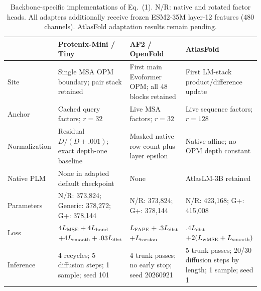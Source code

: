 \begin{table}[t]
\centering
\caption{Backbone-specific implementations of Eq.~(1). N/R: native and rotated factor heads. All adapters additionally receive frozen ESM2-35M layer-12 features (480 channels). AtlasFold adaptation results remain pending.}
\label{tab:interfaces}
\small
\begin{tabularx}{\linewidth}{@{}lXXX@{}}
\toprule
& Protenix-Mini / Tiny & AF2 / OpenFold & AtlasFold \\
\midrule
Site & Single MSA OPM boundary; pair stack retained & First main Evoformer OPM; all 48 blocks retained & First LM-stack product/difference update \\
Anchor & Cached query factors; $r=32$ & Live MSA factors; $r=32$ & Live sequence factors; $r=128$ \\
Normalization & Residual $D/(D+.001)$; exact depth-one baseline & Masked native row count plus layer epsilon & Native affine; no OPM depth constant \\
Native PLM & None in adapted default checkpoint & None & AtlasLM-3B retained \\
Parameters & N/R: 373,824; Generic: 378,272; G+: 378,144 & N/R: 373,824; G+: 378,144 & N/R: 423,168; G+: 415,008 \\
Loss & $4L_{\rm MSE}+4L_{\rm bond}$\newline $+4L_{\rm smooth}+.03L_{\rm dist}$ & $L_{\rm FAPE}+.3L_{\rm dist}$\newline $+L_{\rm torsion}$ & $.4L_{\rm dist}$\newline $+2(L_{\rm wMSE}+L_{\rm smooth})$ \\
Inference & 4 recycles; 5 diffusion steps; 1 sample; seed 101 & 4 trunk passes; no early stop; seed 20260921 & 5 trunk passes; 20/30 diffusion steps by length; 1 sample; seed 1 \\
\bottomrule
\end{tabularx}
\end{table}
